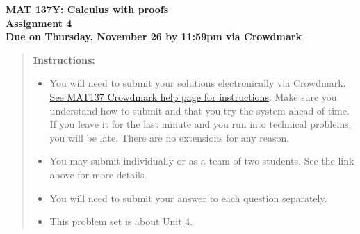 \documentclass[12pt]{exam}
\newcommand{\vv}{\vspace{.1cm}}
\begin{document}
{\large
	\begin{center}
		{\bf MAT 137Y: Calculus with proofs}\\
		{\bf Assignment 4} \\
		{\bf Due on Thursday, November 26 by 11:59pm via Crowdmark}
	\end{center}
}

\vv

\begin{quotation}
{\bf Instructions:}
	\begin{itemize}
		\item	 You will need to submit your solutions electronically via Crowdmark.   \href{https://www.math.toronto.edu/~alfonso/137/PS/137_CM.html}{See MAT137 Crowdmark help page for instructions}.  Make sure you understand how to submit and that you try the system ahead of time.  If you leave it for the last minute and you run into technical problems, you will be late.  There are no extensions for any reason.
		\item You may submit individually or as a team of two students.  See the link above for more details.
		\item  You will need to submit your answer to each question separately.
		\item  This problem set is about Unit 4.
	\end{itemize}
\end{quotation}
\vv
\end{document}
